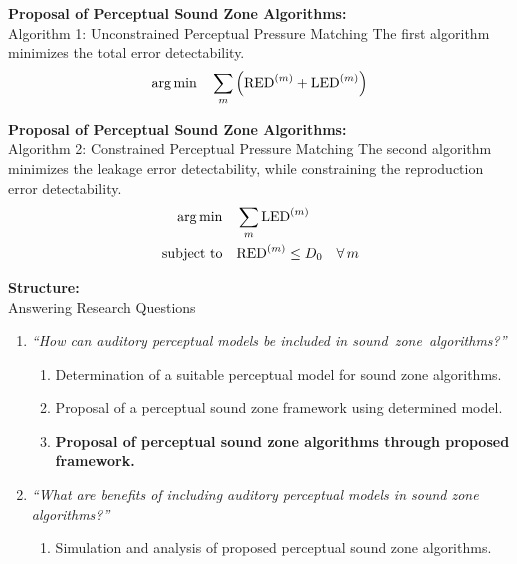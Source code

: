 \documentclass[aspectratio=169]{beamer}
\begin{document}
\begin{frame}{\textbf{Proposal of Perceptual Sound Zone Algorithms:}\\ Algorithm 1: Unconstrained Perceptual Pressure
    Matching}
    The first algorithm minimizes the total error detectability.
    \begin{equation}
        \operatorname*{arg\,min}_{}\quad \sum_m \left(\mathrm{RED}^{(m)} + \mathrm{LED}^{(m)}\right)
    \end{equation}
\end{frame}

\begin{frame}{\textbf{Proposal of Perceptual Sound Zone Algorithms:}\\ Algorithm 2: Constrained Perceptual Pressure
    Matching}
    The second algorithm minimizes the leakage error detectability, while constraining the reproduction error detectability.
    \begin{align}
        \operatorname*{arg\,min}_{}\quad &\sum_m \mathrm{LED}^{(m)}\\
        \operatorname*{subject\,\,to}\quad &\mathrm{RED}^{(m)} \leq D_0 \quad \forall\,m
    \end{align}
\end{frame}

\begin{frame}{\textbf{Structure:}\\ Answering Research Questions}
    \begin{enumerate}
        \item {\textit{``How can auditory perceptual models be included in sound~zone~algorithms?''}}
            \vspace{7pt}
            \begin{enumerate}
                \item Determination of a suitable perceptual model for sound zone algorithms.
                \vspace{7pt}
                \item Proposal of a perceptual sound zone framework using determined model. 
                \vspace{7pt}
                \item \textbf{Proposal of perceptual sound zone algorithms through proposed framework.}
                \vspace{7pt}
            \end{enumerate}
        \item {\textit{``What are benefits of including auditory perceptual models in sound zone algorithms?''}}
            \vspace{-5pt}
            \begin{enumerate}
                \item Simulation and analysis of proposed perceptual sound zone algorithms.
            \end{enumerate}
    \end{enumerate}
\end{frame}
\end{document}
